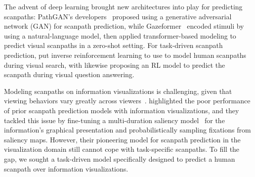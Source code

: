 The advent of deep learning brought new architectures into play for predicting scanpaths:
PathGAN's developers~\cite{assens2018pathgan} proposed using a generative adversarial network (GAN) for scanpath prediction, while 
Gazeformer~\cite{mondal2023gazeformer} encoded stimuli by using a natural-language model, then applied transformer-based modeling to predict visual scanpaths in a zero-shot setting.
For task-driven scanpath prediction, \citet{yang2020predicting} put inverse reinforcement learning to use to model human scanpaths during visual search, with 
\citet{chen2021predicting} likewise proposing an RL model to predict the scanpath during visual question answering.

Modeling scanpaths on information visualizations is challenging, given that viewing behaviors vary greatly across viewers~\cite{polatsek2018exploring}.
\citet{wang2023scanpath} highlighted the poor performance of prior scanpath prediction models with information visualizations, and they tackled this issue by fine-tuning a multi-duration saliency model~\cite{fosco2020predicting} for the information's graphical presentation and probabilistically sampling fixations from saliency maps.
However, their pioneering model for scanpath prediction in the visualization domain still cannot cope with task-specific scanpaths.
To fill the gap, we sought a task-driven model specifically designed to predict a human scanpath over information visualizations.